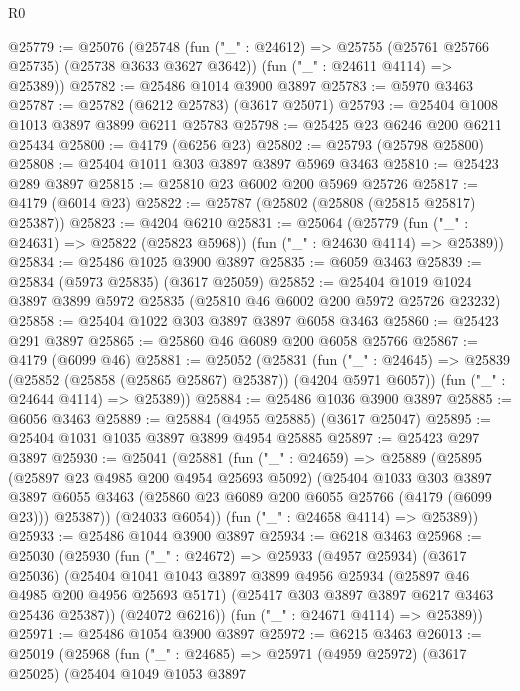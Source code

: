 \begin{lexlean}{R0}
\begin{coremodule}
@25779 := @25076
    (@25748
      (fun ("_" : @24612) => @25755 (@25761 @25766 @25735) (@25738 @3633 @3627 @3642))
      (fun ("_" : @24611 @4114) => @25389))
@25782 := @25486 @1014 @3900 @3897
@25783 := @5970 @3463
@25787 := @25782 (@6212 @25783) (@3617 @25071)
@25793 := @25404 @1008 @1013 @3897 @3899 @6211 @25783
@25798 := @25425 @23 @6246 @200 @6211 @25434
@25800 := @4179 (@6256 @23)
@25802 := @25793 (@25798 @25800)
@25808 := @25404 @1011 @303 @3897 @3897 @5969 @3463
@25810 := @25423 @289 @3897
@25815 := @25810 @23 @6002 @200 @5969 @25726
@25817 := @4179 (@6014 @23)
@25822 := @25787 (@25802 (@25808 (@25815 @25817) @25387))
@25823 := @4204 @6210
@25831 := @25064
    (@25779 (fun ("_" : @24631) => @25822 (@25823 @5968)) (fun ("_" : @24630 @4114) => @25389))
@25834 := @25486 @1025 @3900 @3897
@25835 := @6059 @3463
@25839 := @25834 (@5973 @25835) (@3617 @25059)
@25852 := @25404 @1019 @1024 @3897 @3899 @5972 @25835 (@25810 @46 @6002 @200 @5972 @25726 @23232)
@25858 := @25404 @1022 @303 @3897 @3897 @6058 @3463
@25860 := @25423 @291 @3897
@25865 := @25860 @46 @6089 @200 @6058 @25766
@25867 := @4179 (@6099 @46)
@25881 := @25052
    (@25831
      (fun ("_" : @24645) => @25839 (@25852 (@25858 (@25865 @25867) @25387)) (@4204 @5971 @6057))
      (fun ("_" : @24644 @4114) => @25389))
@25884 := @25486 @1036 @3900 @3897
@25885 := @6056 @3463
@25889 := @25884 (@4955 @25885) (@3617 @25047)
@25895 := @25404 @1031 @1035 @3897 @3899 @4954 @25885
@25897 := @25423 @297 @3897
@25930 := @25041
    (@25881
      (fun ("_" : @24659) =>
      @25889
        (@25895
          (@25897 @23 @4985 @200 @4954 @25693 @5092)
          (@25404
            @1033
            @303
            @3897
            @3897
            @6055
            @3463
            (@25860 @23 @6089 @200 @6055 @25766 (@4179 (@6099 @23)))
            @25387))
        (@24033 @6054))
      (fun ("_" : @24658 @4114) => @25389))
@25933 := @25486 @1044 @3900 @3897
@25934 := @6218 @3463
@25968 := @25030
    (@25930
      (fun ("_" : @24672) =>
      @25933
        (@4957 @25934)
        (@3617 @25036)
        (@25404
          @1041
          @1043
          @3897
          @3899
          @4956
          @25934
          (@25897 @46 @4985 @200 @4956 @25693 @5171)
          (@25417 @303 @3897 @3897 @6217 @3463 @25436 @25387))
        (@24072 @6216))
      (fun ("_" : @24671 @4114) => @25389))
@25971 := @25486 @1054 @3900 @3897
@25972 := @6215 @3463
@26013 := @25019
    (@25968
      (fun ("_" : @24685) =>
      @25971
        (@4959 @25972)
        (@3617 @25025)
        (@25404
          @1049
          @1053
          @3897

\end{coremodule}
\end{lexlean}
